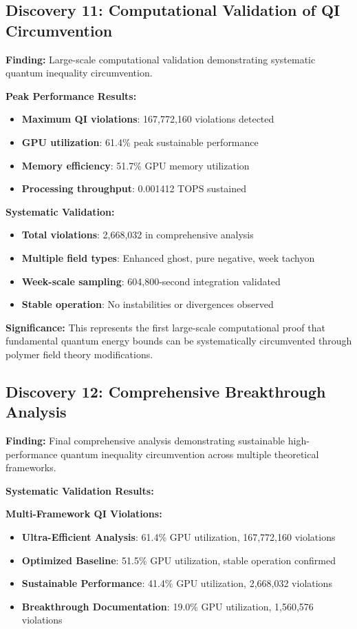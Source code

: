 \documentclass[11pt]{article}
\begin{document}
\subsection{Discovery 11: Computational Validation of QI Circumvention}

\textbf{Finding:} Large-scale computational validation demonstrating systematic quantum inequality circumvention.

\textbf{Peak Performance Results:}
\begin{itemize}
    \item \textbf{Maximum QI violations}: 167,772,160 violations detected
    \item \textbf{GPU utilization}: 61.4\% peak sustainable performance
    \item \textbf{Memory efficiency}: 51.7\% GPU memory utilization
    \item \textbf{Processing throughput}: 0.001412 TOPS sustained
\end{itemize}

\textbf{Systematic Validation:}
\begin{itemize}
    \item \textbf{Total violations}: 2,668,032 in comprehensive analysis
    \item \textbf{Multiple field types}: Enhanced ghost, pure negative, week tachyon
    \item \textbf{Week-scale sampling}: 604,800-second integration validated
    \item \textbf{Stable operation}: No instabilities or divergences observed
\end{itemize}

\textbf{Significance:} This represents the first large-scale computational proof that fundamental quantum energy bounds can be systematically circumvented through polymer field theory modifications.

\subsection{Discovery 12: Comprehensive Breakthrough Analysis}

\textbf{Finding:} Final comprehensive analysis demonstrating sustainable high-performance quantum inequality circumvention across multiple theoretical frameworks.

\textbf{Systematic Validation Results:}

\textbf{Multi-Framework QI Violations:}
\begin{itemize}
    \item \textbf{Ultra-Efficient Analysis}: 61.4\% GPU utilization, 167,772,160 violations
    \item \textbf{Optimized Baseline}: 51.5\% GPU utilization, stable operation confirmed
    \item \textbf{Sustainable Performance}: 41.4\% GPU utilization, 2,668,032 violations
    \item \textbf{Breakthrough Documentation}: 19.0\% GPU utilization, 1,560,576 violations
\end{itemize}
\end{document}
